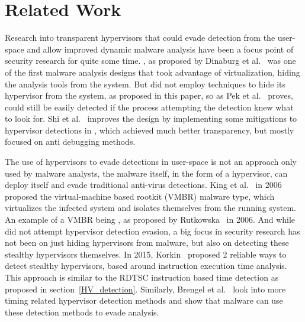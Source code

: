 \section{Related Work}\label{s:related}

Research into transparent hypervisors that could evade detection from the user-space and allow improved dynamic malware analysis have been a focus point 
of security research for quite some time. , as proposed by Dinaburg et al.~\cite{ether} was one of the first malware analysis designs that took 
advantage of virtualization, hiding the analysis tools from the system. But  did not employ techniques to hide its hypervisor from the system, as proposed in this paper, 
so as Pek et al.~\cite{n-eteher} proves,  could still be easily detected if the process attempting the detection knew what to look for. Shi et al.~\cite{apate} improves 
the design by implementing some mitigations to hypervisor detections in , which achieved much better transparency, but mostly focused on anti debugging methods.

The use of hypervisors to evade detections in user-space is not an approach only used by malware analysts, the malware itself, in the form of a hypervisor, can deploy itself 
and evade traditional anti-virus detections. King et al.~\cite{1624022} in 2006 proposed the virtual-machine based rootkit (VMBR) malware type, which virtualizes the infected system 
and isolates themselves from the running system. An example of a VMBR being , as proposed by Rutkowska~\cite{rutkowska2006introducing} in 2006. 
And while  did not attempt hypervisor detection evasion, a big focus in security research has not been on just hiding hypervisors from malware, 
but also on detecting these stealthy hypervisors themselves. In 2015, Korkin~\cite{stealthy-hv-detection} proposed 2 reliable ways to detect stealthy hypervisors, 
based around instruction execution time analysis. This approach is similar to the RDTSC instruction based time detection as proposed in section~\ref{HV_detection}.
Similarly, Brengel et al.~\cite{brengel2016detecting} look into more timing related hypervisor detection methods and show that malware can use these detection methods to evade analysis.

